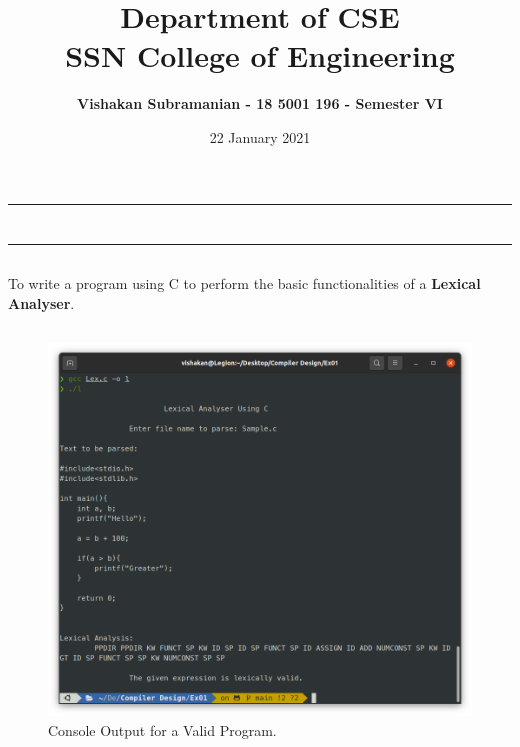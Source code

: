 \documentclass[12pt, a4]{article}
\title{\textbf{Department of CSE\\SSN College of Engineering}}
\author{\textbf{Vishakan Subramanian - 18 5001 196 - Semester VI}}
\date{22 January 2021}
\begin{document}
\maketitle
\hrule
\section*{}
\hrule
\bigskip

\subsection*{}
\subsection*{}
\begin{flushleft}
To write a program using C to perform the
basic functionalities of a \textbf{Lexical Analyser}.
\end{flushleft}

\newpage
\subsection*{}
\begin{flushleft}

\end{flushleft}

\newpage
\subsection*{}
\begin{figure}[h]
\centering
\caption{Console Output for a Valid Program.}
\includegraphics[scale= 0.5]{valid_example.png}
\end{figure}
\end{document}
